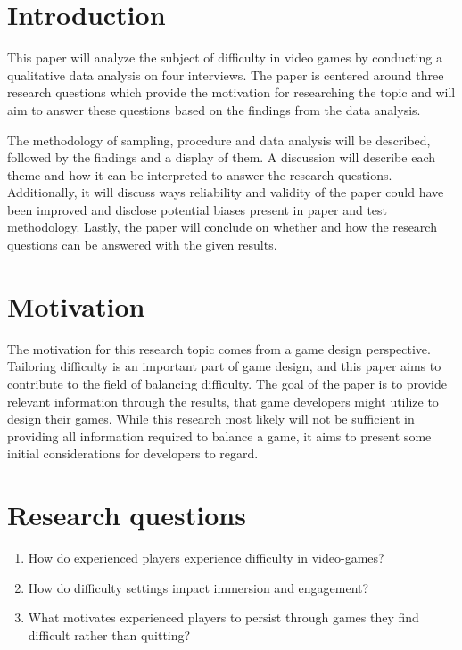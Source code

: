 
\section{Introduction}

This paper will analyze the subject of difficulty in video games by conducting a qualitative data analysis on four interviews. The paper is centered around three research questions which provide the motivation for researching the topic and will aim to answer these questions based on the findings from the data analysis. 

The methodology of sampling, procedure and data analysis will be described, followed by the findings and a display of them. A discussion will describe each theme and how it can be interpreted to answer the research questions. Additionally, it will discuss ways reliability and validity of the paper could have been improved and disclose potential biases present in paper and test methodology. Lastly, the paper will conclude on whether and how the research questions can be answered with the given results. 

\section{Motivation}

The motivation for this research topic comes from a game design perspective. Tailoring difficulty is an important part of game design, and this paper aims to contribute to the field of balancing difficulty. The goal of the paper is to provide relevant information through the results, that game developers might utilize to design their games. While this research most likely will not be sufficient in providing all information required to balance a game, it aims to present some initial considerations for developers to regard.

\section{Research questions} \label{Research questions}

\begin{enumerate}
    \item How do experienced players experience difficulty in video-games?
    \item How do difficulty settings impact immersion and engagement? 
    \item What motivates experienced players to persist through games they find difficult rather than quitting?
\end{enumerate}

